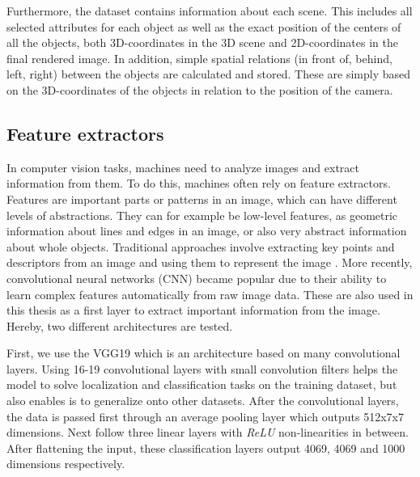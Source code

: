 Furthermore, the dataset contains information about each scene.
This includes all selected attributes for each object as well as the exact position of the centers of all the objects, both 3D-coordinates in the 3D scene and 2D-coordinates in the final rendered image.
In addition, simple spatial relations (in front of, behind, left, right) between the objects are calculated and stored.
These are simply based on the 3D-coordinates of the objects in relation to the position of the camera.

\subsection{Feature extractors}
\label{sec:feature-extractors}
In computer vision tasks, machines need to analyze images and extract information from them.
To do this, machines often rely on feature extractors.
Features are important parts or patterns in an image, which can have different levels of abstractions.
They can for example be low-level features, as geometric information about lines and edges in an image, or also very abstract information about whole objects.
Traditional approaches involve extracting key points and descriptors from an image and using them to represent the image \citep{Harris1988,Lowe1999,Bay2006}.
More recently, convolutional neural networks (CNN) became popular due to their ability to learn complex features automatically from raw image data.
These are also used in this thesis as a first layer to extract important information from the image. Hereby, two different architectures are tested.

First, we use the VGG19 \citep{Simonyan2015} which is an architecture based on many convolutional layers.
Using 16-19 convolutional layers with small convolution filters helps the model to solve localization and classification tasks on the training dataset, but also enables is to generalize onto other datasets.
After the convolutional layers, the data is passed first through an average pooling layer which outputs 512x7x7 dimensions.
Next follow three linear layers with \emph{ReLU} non-linearities in between.
After flattening the input, these classification layers output 4069, 4069 and 1000 dimensions respectively.

